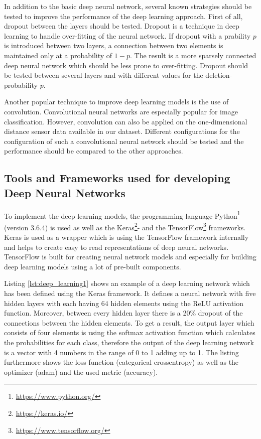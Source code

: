 In addition to the basic deep neural network, several known strategies should be tested to improve the performance of the deep learning approach. First of all, dropout between the layers should be tested. Dropout is a technique in deep learning to handle over-fitting of the neural network. If dropout with a prability $p$ is introduced between two layers, a connection between two elements is maintained only at a probability of $1-p$. The result is a more sparsely connected deep neural network which should be less prone to over-fitting. Dropout should be tested between several layers and with different values for the deletion-probability $p$.

Another popular technique to improve deep learning models is the use of convolution. Convolutional neural networks are especially popular for image classification. However, convolution can also be applied on the one-dimensional distance sensor data available in our dataset. Different configurations for the configuration of such a convolutional neural network should be tested and the performance should be compared to the other approaches.


\subsection{Tools and Frameworks used for developing Deep Neural Networks}

To implement the deep learning models, the programming language Python\footnote{\url{https://www.python.org/}} (version 3.6.4) is used as well as the Keras\footnote{\url{https://keras.io/}}- and the TensorFlow\footnote{\url{https://www.tensorflow.org/}} frameworks. Keras is used as a wrapper which is using the TensorFlow framework internally and helps to create easy to read representations of deep neural networks. TensorFlow is built for creating neural network models and especially for building deep learning models using a lot of pre-built components. 


Listing \ref{lst:deep_learning1} shows an example of a deep learning network which has been defined using the Keras framework. It defines a neural network with five hidden layers with each having 64 hidden elements using the ReLU activation function. Moreover, between every hidden layer there is a 20\% dropout of the connections between the hidden elements. To get a result, the output layer which consists of four elements is using the softmax activation function which calculates the probabilities for each class, therefore the output of the deep learning network is a vector with 4 numbers in the range of 0 to 1 adding up to 1. The listing furthermore shows the loss function (categorical crossentropy) as well as the optimizer (adam) and the used metric (accuracy).



